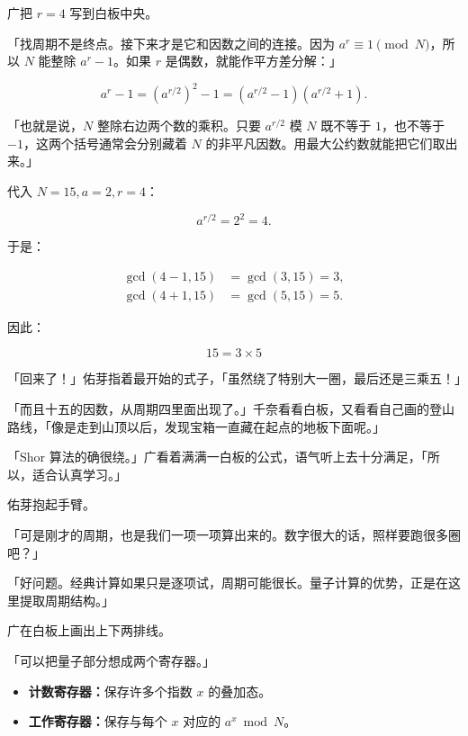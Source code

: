 广把 $r=4$ 写到白板中央。

「找周期不是终点。接下来才是它和因数之间的连接。因为 $a^r\equiv1\pmod N$，所以 $N$ 能整除 $a^r-1$。如果 $r$ 是偶数，就能作平方差分解：」

\begin{equation}
a^r-1=\left(a^{r/2}\right)^2-1
=\left(a^{r/2}-1\right)\left(a^{r/2}+1\right).
\end{equation}

「也就是说，$N$ 整除右边两个数的乘积。只要 $a^{r/2}$ 模 $N$ 既不等于 $1$，也不等于 $-1$，这两个括号通常会分别藏着 $N$ 的非平凡因数。用最大公约数就能把它们取出来。」

代入 $N=15,a=2,r=4$：

\begin{equation}
a^{r/2}=2^2=4.
\end{equation}

于是：

\begin{align}
\gcd(4-1,15)&=\gcd(3,15)=3,\\
\gcd(4+1,15)&=\gcd(5,15)=5.
\end{align}

因此：

\begin{equation}
\boxed{15=3\times5}
\end{equation}

「回来了！」佑芽指着最开始的式子，「虽然绕了特别大一圈，最后还是三乘五！」

「而且十五的因数，从周期四里面出现了。」千奈看看白板，又看看自己画的登山路线，「像是走到山顶以后，发现宝箱一直藏在起点的地板下面呢。」

「Shor 算法的确很绕。」广看着满满一白板的公式，语气听上去十分满足，「所以，适合认真学习。」

佑芽抱起手臂。

「可是刚才的周期，也是我们一项一项算出来的。数字很大的话，照样要跑很多圈吧？」

「好问题。经典计算如果只是逐项试，周期可能很长。量子计算的优势，正是在这里提取周期结构。」

广在白板上画出上下两排线。

「可以把量子部分想成两个寄存器。」

\begin{itemize}[leftmargin=2em]
  \item \textbf{计数寄存器：}保存许多个指数 $x$ 的叠加态。
  \item \textbf{工作寄存器：}保存与每个 $x$ 对应的 $a^x \bmod N$。
\end{itemize}

